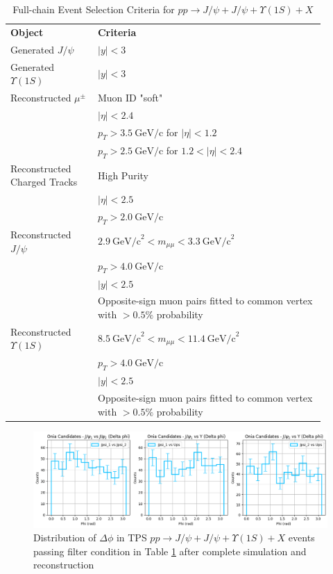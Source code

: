 \documentclass[10pt,twocolumn]{article}
\newcommand*{\GeVc}{~\text{GeV/c}}
\newcommand*{\GeVcs}{~\text{GeV/c}^2}
\begin{document}
\begin{table}[]
    \centering
    \caption{Full-chain Event Selection Criteria for $pp\to J/\psi+J/\psi+\Upsilon(1S)+X$\\}
    \begin{tabular}{p{0.25\linewidth} p{0.65\linewidth}}
    \toprule
        \textbf{Object} & \textbf{Criteria} \\
        Generated $J/\psi $         & $\left|y\right|<3$ \\
        \midrule
        Generated $\Upsilon(1S)$    & $\left|y\right|<3$ \\
        \midrule
        Reconstructed $\mu^\pm $ & Muon ID "soft" \\
                & $|\eta| < 2.4$ \\
                & $p_T > 3.5\GeVc$ for $|\eta| < 1.2$ \\
                & $p_T > 2.5\GeVc$ for $1.2 < |\eta| < 2.4$ \\
        Reconstructed Charged Tracks & High Purity \\
                  & $|\eta|<2.5$ \\
                  & $p_T > 2.0 \GeVc$ \\
        \midrule
        Reconstructed $J/\psi$ & $2.9 \GeVcs < m_{\mu\mu} < 3.3 \GeVcs$ \\
                & $p_T > 4.0\GeVc$ \\
                & $|y| < 2.5$ \\
                & Opposite-sign muon pairs fitted to common vertex with $> 0.5\%$ probability \\
        \midrule
        Reconstructed $\Upsilon(1S)$ & $8.5\GeVcs < m_{\mu\mu} < 11.4 \GeVcs$ \\
                & $p_T > 4.0\GeVc$ \\
                & $|y| < 2.5$ \\
                & Opposite-sign muon pairs fitted to common vertex with $> 0.5\%$ probability \\
        \bottomrule
    \end{tabular}
    \label{tab:JpsiJpsiY_MC_Full_Filter}
\end{table}

\begin{figure}
    \centering
    \includegraphics[width=1.0\linewidth]{images/Ntuple_LEVEL_TPS_DeltaPhi_filtered.png}
    \caption{Distribution of $\Delta \phi$ in TPS $pp\to J/\psi+J/\psi+\Upsilon(1S)+X$ events passing filter condition in Table \ref{tab:JpsiJpsiY_MC_Full_Filter} after complete simulation and reconstruction}
    \label{fig:TPS_JJY1S_filtered_DeltaPhi_Ntuple}
\end{figure}
\end{document}
